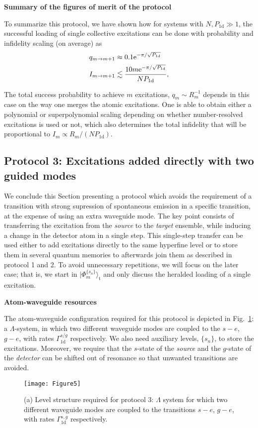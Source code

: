 \documentclass[twocolumn,pra,aps,superscriptaddress,showpacs]{revtex4-1}
\newcommand{\ket}[1]{|#1\rangle}
\def\oned{\mathrm{1d}}
\def\ee{\mathord{\rm e}}
\newcommand{\rt}{\mathrm{t}}
\begin{document}
\textbf{Summary of the figures of merit of the protocol}

To summarize this protocol, we have shown how for systems with $N,P_\oned\gg 1$, the successful loading of single collective excitations can be done with probability and infidelity scaling (on average) as
\begin{align}
	q_{m\rightarrow m+1} &\approx 0.1 \ee^{- \pi / \sqrt{P_\oned}} \\
		I_{m\rightarrow m+1} &\lesssim \frac{10 m  \ee^{-\pi / \sqrt{P_\oned}}}{N P_{\oned}},
\end{align}

The total success probability to achieve $m$ excitations, $q_m\sim R_{m}^{-1}$ depends in this case on the way one merges the atomic excitations. One is able to obtain either a polynomial or superpolynomial scaling depending on whether number-resolved excitations is used or not, which also determines the total infidelity that will be proportional to $I_m\propto R_m /(NP_\oned)$.

\subsection{Protocol 3: Excitations added directly with two guided modes \label{sec:new}}

We conclude this Section presenting a protocol which avoids the requirement of a transition with strong supression of spontaneous emission in a specific transition, at the expense of using an extra waveguide mode. The key point consists of transferring the excitation from the \emph{source} to the \emph{target} ensemble, while inducing a change in the detector atom in a single step. This single-step transfer can be used either to add excitations directly to the same hyperfine level or to store them in several quantum memories to afterwards join them as described in protocol 1 and 2. To avoid unnecessary repetitions, we will focus on the later case; that is, we start in $\ket{\Phi_m^{\{s_n\}}}_\rt$ and only discuss the heralded loading of a single excitation.

\textbf{Atom-waveguide resources}

The atom-waveguide configuration required for this protocol is depicted in Fig.~\ref{fig:SingleStep}: a $\Lambda$-system, in which two different waveguide modes are coupled to the $s-e$, $g-e$, with rates $\Gamma_\oned^{s/g}$ respectively. We also need auxiliary levels, $\{s_n\}$, to store the excitations. Moreover, we require that the $s$-state of the \emph{source} and the $g$-state of the \emph{detector} can be shifted out of resonance so that unwanted transitions are avoided.
%
\begin{figure}[t]
	\centering
	\texttt{[image: Figure5]}
	\caption{
		(a) Level structure required for protocol 3: $\Lambda$ system for which two different waveguide modes are coupled to the transitions $s-e$, $g-e$, with rates $\Gamma_\oned^{s,g}$ respectively.
	}
	\label{fig:SingleStep}
\end{figure}
\end{document}
